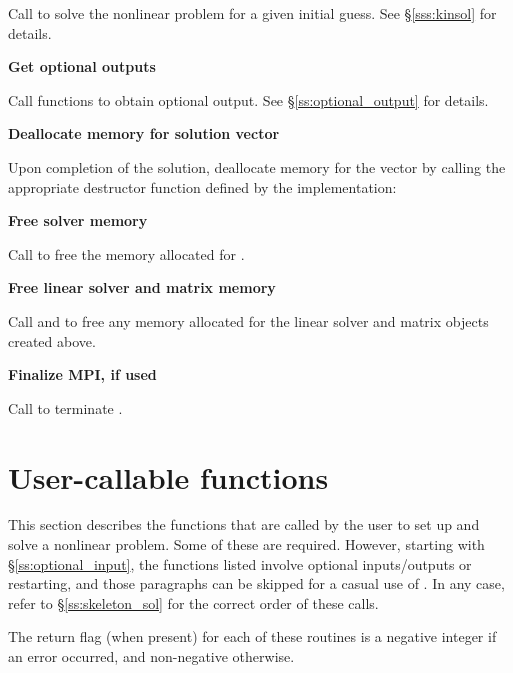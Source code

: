\begin{Steps}
  Call  to solve the nonlinear problem for a given
  initial guess. See \S\ref{sss:kinsol} for details.

\item
  {\bf Get optional outputs}

  Call  functions to obtain optional output.
  See \S\ref{ss:optional_output} for details.

\item
  {\bf Deallocate memory for solution vector}

  Upon completion of the solution, deallocate memory for the vector  by
  calling the appropriate destructor function defined by the {\nvector} implementation:


\item
  {\bf Free solver memory}

  Call  to free the memory allocated for {\kinsol}.

\item
  {\bf Free linear solver and matrix memory}

  Call  and  to free any memory
  allocated for the linear solver and matrix objects created above.

\item
  {\bf Finalize MPI, if used}

  Call  to terminate {\mpi}.

\end{Steps}




\section{User-callable functions}\label{s:kinsol_fct_sol}

This section describes the {\kinsol} functions that are called by the
user to set up and solve a nonlinear problem. Some of these are required.
However, starting with \S\ref{ss:optional_input}, the functions listed involve
optional inputs/outputs or restarting, and those paragraphs can be
skipped for a casual use of {\kinsol}. In any case, refer to
\S\ref{ss:skeleton_sol} for the correct order of these calls.

The return flag (when present) for each of these routines is a
negative integer if an error occurred, and non-negative otherwise.

